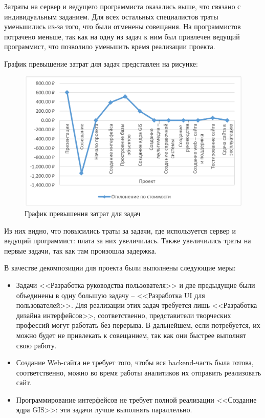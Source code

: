 Затраты на сервер и ведущего программиста оказались выше, что связано с индивидуальным заданием. 
Для всех остальных специалистов траты уменьшились из-за того, что были отменены совещания.
На программистов потрачено меньше, так как на одну из задач к ним был привлечен ведущий программист, что позволило уменьшить время реализации проекта.

\newpage
График превышение затрат для задач представлен на рисунке:
\FloatBarrier
\begin{figure}[h]	
	\begin{center}
		\includegraphics[width=\linewidth]{inc/listTasks.png}
	\end{center}
	\captionsetup{justification=centering}
	\caption{График превышения затрат для задач}
\end{figure}
\FloatBarrier 

Из них видно, что повысились траты за задачи, где используется сервер и ведущий программист: плата за них увеличилась.
Также увеличились траты на первые задачи, так как там произошла задержка.

\newpage
{}
В качестве декомпозиции для проекта были выполнены следующие меры:
\begin{itemize}
	\item Задачи <<Разработка руководства пользователя>> и две предыдущие были объединены в одну большую задачу -- <<Разработка UI для пользователей>>.
	Для реализации этих задач требуется лишь <<Разработка дизайна интерфейсов>>, соответственно, представители творческих профессий могут работать без перерыва.
	В дальнейшем, если потребуется, их можно будет не привлекать к совещанием, так как они быстрее выполнят свою работу.
	\item Создание Web-сайта не требует того, чтобы вся backend-часть была готова, соответственно, можно во время работы аналитиков их отправить реализовать сайт.
	\item Программирование интерфейсов не требует полной реализации <<Создание ядра GIS>>: эти задачи лучше выполнять параллельно.
\end{itemize}

